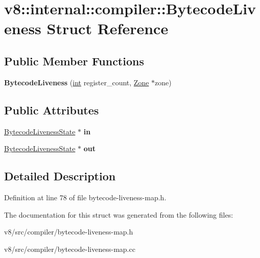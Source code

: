 \hypertarget{structv8_1_1internal_1_1compiler_1_1BytecodeLiveness}{}\section{v8\+:\+:internal\+:\+:compiler\+:\+:Bytecode\+Liveness Struct Reference}
\label{structv8_1_1internal_1_1compiler_1_1BytecodeLiveness}
\subsection*{Public Member Functions}
\begin{DoxyCompactItemize}
\item 
\mbox{\label{structv8_1_1internal_1_1compiler_1_1BytecodeLiveness_a62229abea839ac3c63cc377d07a5a6e0}} 
{\bfseries Bytecode\+Liveness} (\mbox{\hyperlink{classint}{int}} register\+\_\+count, \mbox{\hyperlink{classv8_1_1internal_1_1Zone}{Zone}} $\ast$zone)
\end{DoxyCompactItemize}
\subsection*{Public Attributes}
\begin{DoxyCompactItemize}
\item 
\mbox{\label{structv8_1_1internal_1_1compiler_1_1BytecodeLiveness_a0d9bd0c36218865de0104746116a7aca}} 
\mbox{\hyperlink{classv8_1_1internal_1_1compiler_1_1BytecodeLivenessState}{Bytecode\+Liveness\+State}} $\ast$ {\bfseries in}
\item 
\mbox{\label{structv8_1_1internal_1_1compiler_1_1BytecodeLiveness_ae649b67fe6af9328c27f56502c677a63}} 
\mbox{\hyperlink{classv8_1_1internal_1_1compiler_1_1BytecodeLivenessState}{Bytecode\+Liveness\+State}} $\ast$ {\bfseries out}
\end{DoxyCompactItemize}


\subsection{Detailed Description}


Definition at line 78 of file bytecode-\/liveness-\/map.\+h.



The documentation for this struct was generated from the following files\+:\begin{DoxyCompactItemize}
\item 
v8/src/compiler/bytecode-\/liveness-\/map.\+h\item 
v8/src/compiler/bytecode-\/liveness-\/map.\+cc\end{DoxyCompactItemize}
